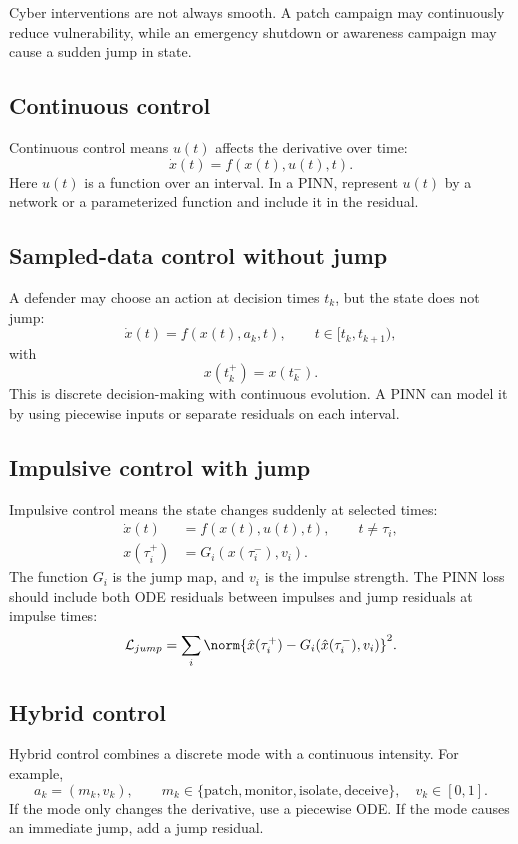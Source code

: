 \documentclass[11pt,a4paper]{article}
\begin{document}
Cyber interventions are not always smooth. A patch campaign may continuously reduce vulnerability, while an emergency shutdown or awareness campaign may cause a sudden jump in state.

\subsection{Continuous control}
Continuous control means $u(t)$ affects the derivative over time:
\begin{equation}
    \dot{x}(t)=f(x(t),u(t),t).
\end{equation}
Here $u(t)$ is a function over an interval. In a PINN, represent $u(t)$ by a network or a parameterized function and include it in the residual.

\subsection{Sampled-data control without jump}
A defender may choose an action at decision times $t_k$, but the state does not jump:
\begin{equation}
    \dot{x}(t)=f(x(t),a_k,t), \qquad t\in[t_k,t_{k+1}),
\end{equation}
with
\begin{equation}
    x(t_k^+)=x(t_k^-).
\end{equation}
This is discrete decision-making with continuous evolution. A PINN can model it by using piecewise inputs or separate residuals on each interval.

\subsection{Impulsive control with jump}
Impulsive control means the state changes suddenly at selected times:
\begin{align}
    \dot{x}(t)&=f(x(t),u(t),t), \qquad t\ne \tau_i,\\
    x(\tau_i^+)&=G_i(x(\tau_i^-),v_i).
\end{align}
The function $G_i$ is the jump map, and $v_i$ is the impulse strength. The PINN loss should include both ODE residuals between impulses and jump residuals at impulse times:
\begin{equation}
    \mathcal{L}_{jump}=\sum_i \norm{\hat{x}(\tau_i^+)-G_i(\hat{x}(\tau_i^-),v_i)}^2.
\end{equation}

\subsection{Hybrid control}
Hybrid control combines a discrete mode with a continuous intensity. For example,
\begin{equation}
    a_k=(m_k,v_k), \qquad m_k\in\{\text{patch},\text{monitor},\text{isolate},\text{deceive}\},\quad v_k\in[0,1].
\end{equation}
If the mode only changes the derivative, use a piecewise ODE. If the mode causes an immediate jump, add a jump residual.
\end{document}
